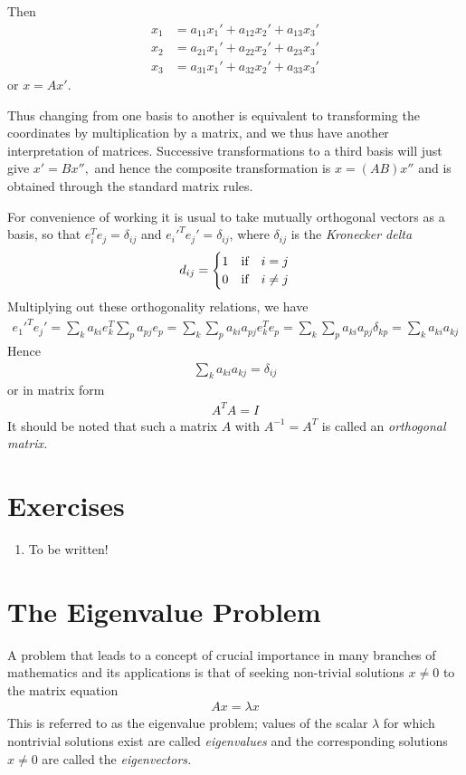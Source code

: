 \documentclass[12pt,a4paper,fleqn]{mycalc}
\begin{document}
	Then
	\begin{align*}
	x_1&=a_{11}x_1'+a_{12}x_2'+a_{13}x_3'\\
	x_2&=a_{21}x_1'+a_{22}x_2'+a_{23}x_3'\\
	x_3&=a_{31}x_1'+a_{32}x_2'+a_{33}x_3'
	\end{align*}
	or $ x=Ax'. $
	\par
	Thus changing from one basis to another is equivalent to transforming the coordinates by multiplication by a matrix, and we thus have another interpretation of matrices. Successive transformations to a third basis will just give $ x' = Bx'', $ and hence the composite transformation is $ x = (AB)x'' $ and is obtained through the standard matrix rules.
	\par
	For convenience of working it is usual to take mutually orthogonal vectors as a basis, so that $ e_i^{T}e_j=\delta_{ij} $ and $ e_i'^{T}e_j'=\delta_{ij} $, where $\delta_{ij}$ is the \emph{Kronecker delta}
	\begin{align*}
	d_{ij}=\begin{cases}
	1 &\textnormal{if}\quad i=j\\
	0 &\textnormal{if}\quad i\neq j
	\end{cases}
	\end{align*}
	Multiplying out these orthogonality relations, we have
	\begin{align*}
	e_1'^{T}e_j'=\sum_{k}a_{ki}e_k^{T}\sum_{p}a_{pj}e_p
	=\sum_{k}\sum_{p}a_{ki}a_{pj}e_k^{T}e_p
	=\sum_{k}\sum_{p}a_{ki}a_{pj}\delta_{kp}
	=\sum_{k}a_{ki}a_{kj}
	\end{align*}
	Hence
	\begin{align*}
	\sum_{k}a_{ki}a_{kj}=\delta_{ij}
	\end{align*}
	or in matrix form
	\begin{align*}
	A^{T}A=I
	\end{align*}
	It should be noted that such a matrix $ A $ with $ A^{-1} = A^{T} $ is called an \emph{orthogonal matrix.}
	\section*{Exercises}
	\begin{enumerate}
		\item To be written!
	\end{enumerate}
	\section{The Eigenvalue Problem}
	A problem that leads to a concept of crucial importance in many branches of mathematics and its applications is that of seeking non-trivial solutions $ x \neq 0 $ to the matrix equation
	\begin{align*}
	Ax = \lambda x
	\end{align*}
	This is referred to as the eigenvalue problem; values of the scalar $ \lambda $ for which nontrivial solutions exist are called \emph{eigenvalues} and the corresponding solutions $ x \neq 0 $ are
	called the \emph{eigenvectors.}
\end{document}
